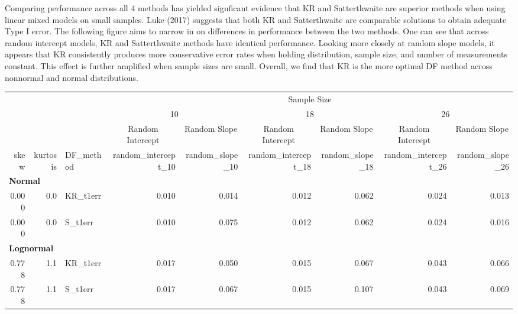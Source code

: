 \documentclass[12pt, twoside]{amherstthesis}
\begin{document}
Comparing performance across all 4 methods has yielded signficant evidence that KR and Satterthwaite are superior methods when using linear mixed models on small samples. Luke (2017) suggests that both KR and Satterthwaite are comparable solutions to obtain adequate Type I error. The following figure aims to narrow in on differences in performance between the two methods. One can see that across random intercept models, KR and Satterthwaite methods have identical performance. Looking more closely at random slope models, it appears that KR consistently produces more conservative error rates when holding distribution, sample size, and number of measurements constant. This effect is further amplified when sample sizes are small. Overall, we find that KR is the more optimal DF method across nonnormal and normal distributions.
\begin{landscape}
\begin{tabular}[t]{r|r|l|r|r|r|r|r|r}
\hline
\multicolumn{3}{c|}{ } & \multicolumn{6}{c}{Sample Size} \\
\cline{4-9}
\multicolumn{3}{c|}{ } & \multicolumn{2}{c|}{10} & \multicolumn{2}{c|}{18} & \multicolumn{2}{c}{26} \\
\cline{4-5} \cline{6-7} \cline{8-9}
\multicolumn{3}{c|}{ } & \multicolumn{1}{c|}{Random Intercept} & \multicolumn{1}{c|}{Random Slope} & \multicolumn{1}{c|}{Random Intercept} & \multicolumn{1}{c|}{Random Slope} & \multicolumn{1}{c|}{Random Intercept} & \multicolumn{1}{c}{Random Slope} \\
\cline{4-4} \cline{5-5} \cline{6-6} \cline{7-7} \cline{8-8} \cline{9-9}
skew & kurtosis & DF\_method & random\_intercept\_10 & random\_slope\_10 & random\_intercept\_18 & random\_slope\_18 & random\_intercept\_26 & random\_slope\_26\\
\hline
\multicolumn{9}{l}{\textbf{Normal}}\\
\hline
\hspace{1em}0.000 & 0.0 & KR\_t1err & 0.010 & 0.014 & 0.012 & 0.062 & 0.024 & 0.013\\
\hline
\hspace{1em}0.000 & 0.0 & S\_t1err & 0.010 & 0.075 & 0.012 & 0.062 & 0.024 & 0.016\\
\hline
\multicolumn{9}{l}{\textbf{Lognormal}}\\
\hline
\hspace{1em}0.778 & 1.1 & KR\_t1err & 0.017 & 0.050 & 0.015 & 0.067 & 0.043 & 0.066\\
\hline
\hspace{1em}0.778 & 1.1 & S\_t1err & 0.017 & 0.067 & 0.015 & 0.107 & 0.043 & 0.069\\

\end{tabular}
\end{landscape}
\end{document}
